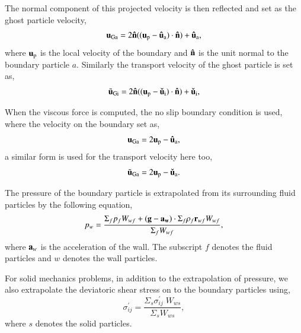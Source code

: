 The normal component of this projected velocity is then reflected and set as
the ghost particle velocity,
\begin{equation}
  \label{eq:free-slip-bc-u}
  \mathbf{u}_{\text{Ga}} = 2 \mathbf{\hat{n}}((\mathbf{u}_{\text{p}} - \mathbf{\hat{u}}_{\text{a}})\cdot \mathbf{\hat{n}}) + \mathbf{\hat{u}}_{\text{a}},
\end{equation}
where $\mathbf{u}_{\text{p}}$ is the local velocity of the boundary and
$\mathbf{\hat{n}}$ is the unit normal to the boundary particle $a$. Similarly the
transport velocity of the ghost particle is set as,
\begin{equation}
  \label{eq:free-slip-bc-u}
  \tilde{\mathbf{u}}_{\text{Gi}} = 2 \mathbf{\hat{n}}((\mathbf{u}_{\text{p}} - \mathbf{\check{u}}_{\text{i}})\cdot \mathbf{\hat{n}}) + \mathbf{\check{u}}_{\text{i}},
\end{equation}

When the viscous force is computed, the no slip boundary condition is used,
where the velocity on the boundary set as,
\begin{equation}
  \label{eq:no-slip-bc-u}
  \mathbf{u}_{\text{Ga}} = 2 \mathbf{u}_{\text{p}} - \mathbf{\hat{u}}_{\text{a}},
\end{equation}
a similar form is used for the transport velocity here too,
\begin{equation}
  \label{eq:no-slip-bc-uhat}
  \tilde{\mathbf{u}}_{\text{Ga}} = 2 \mathbf{u}_{\text{p}} - \mathbf{\check{u}}_{\text{a}}.
\end{equation}

The pressure of the boundary particle is extrapolated from its surrounding
fluid particles by the following equation,
\begin{equation}
  \label{eq:pressure-bc}
  p_w = \frac{\Sigma_f p_f W_{wf} + (\mathbf{g} - \mathbf{a}_{\mathbf{w}}) \cdot \Sigma_f
    \rho_f \mathbf{r}_{wf} W_{wf}}{\Sigma_f W_{wf}},
\end{equation}
where $\mathbf{a}_w$ is the acceleration of the wall. The subscript $f$ denotes
the fluid particles and $w$ denotes the wall particles.

For solid mechanics problems, in addition to the extrapolation of pressure, we
also extrapolate the deviatoric shear stress on to the boundary particles
using,
\begin{equation}
  \label{eq:shear-stress-bc}
  \sigma_{ij}^{'} = \frac{\Sigma_s \sigma_{ij}^{'} \; W_{ws}}{\Sigma_s W_{ws}},
\end{equation}
where $s$ denotes the solid particles.



